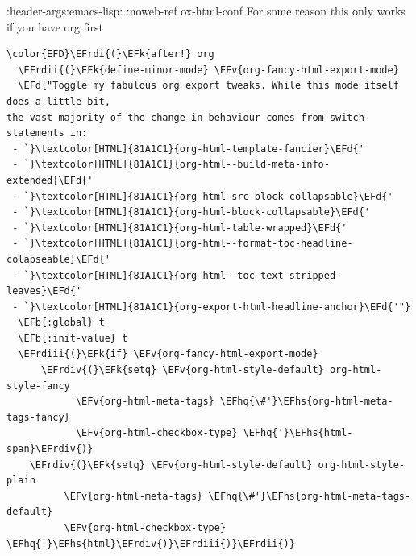 \documentclass{scrartcl}
\newcommand{\EFk}[1]{\textcolor{EFk}{#1}} %
\newcommand{\EFd}[1]{\textcolor{EFd}{#1}} %
\newcommand{\EFb}[1]{\textcolor{EFb}{#1}} %
\newcommand{\EFv}[1]{\textcolor{EFv}{#1}} %
\newcommand{\EFhq}[1]{#1} %
\newcommand{\EFhs}[1]{#1} %
\newcommand{\EFrdi}[1]{#1} %
\newcommand{\EFrdii}[1]{#1} %
\newcommand{\EFrdiii}[1]{#1} %
\newcommand{\EFrdiv}[1]{#1} %
\begin{document}
:header-args:emacs-lisp: :noweb-ref ox-html-conf
For some reason this only works if you have org first
\begin{Code}
\begin{Verbatim}[]
\color{EFD}\EFrdi{(}\EFk{after!} org
  \EFrdii{(}\EFk{define-minor-mode} \EFv{org-fancy-html-export-mode}
  \EFd{"Toggle my fabulous org export tweaks. While this mode itself does a little bit,
the vast majority of the change in behaviour comes from switch statements in:
 - `}\textcolor[HTML]{81A1C1}{org-html-template-fancier}\EFd{'
 - `}\textcolor[HTML]{81A1C1}{org-html--build-meta-info-extended}\EFd{'
 - `}\textcolor[HTML]{81A1C1}{org-html-src-block-collapsable}\EFd{'
 - `}\textcolor[HTML]{81A1C1}{org-html-block-collapsable}\EFd{'
 - `}\textcolor[HTML]{81A1C1}{org-html-table-wrapped}\EFd{'
 - `}\textcolor[HTML]{81A1C1}{org-html--format-toc-headline-colapseable}\EFd{'
 - `}\textcolor[HTML]{81A1C1}{org-html--toc-text-stripped-leaves}\EFd{'
 - `}\textcolor[HTML]{81A1C1}{org-export-html-headline-anchor}\EFd{'"}
  \EFb{:global} t
  \EFb{:init-value} t
  \EFrdiii{(}\EFk{if} \EFv{org-fancy-html-export-mode}
      \EFrdiv{(}\EFk{setq} \EFv{org-html-style-default} org-html-style-fancy
            \EFv{org-html-meta-tags} \EFhq{\#'}\EFhs{org-html-meta-tags-fancy}
            \EFv{org-html-checkbox-type} \EFhq{'}\EFhs{html-span}\EFrdiv{)}
    \EFrdiv{(}\EFk{setq} \EFv{org-html-style-default} org-html-style-plain
          \EFv{org-html-meta-tags} \EFhq{\#'}\EFhs{org-html-meta-tags-default}
          \EFv{org-html-checkbox-type} \EFhq{'}\EFhs{html}\EFrdiv{)}\EFrdiii{)}\EFrdii{)}


\end{Verbatim}
\end{Code}
\end{document}
